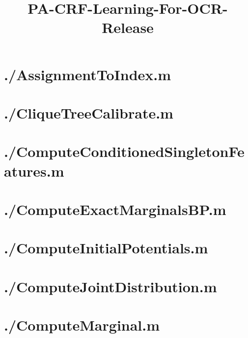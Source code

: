 \documentclass{article}
\title{PA-CRF-Learning-For-OCR-Release}
\begin{document}
\maketitle
\label{toc}
\tableofcontents
\newpage
\section{./AssignmentToIndex.m}

\section{./CliqueTreeCalibrate.m}

\section{./ComputeConditionedSingletonFeatures.m}

\section{./ComputeExactMarginalsBP.m}

\section{./ComputeInitialPotentials.m}

\section{./ComputeJointDistribution.m}

\section{./ComputeMarginal.m}

\end{document}
